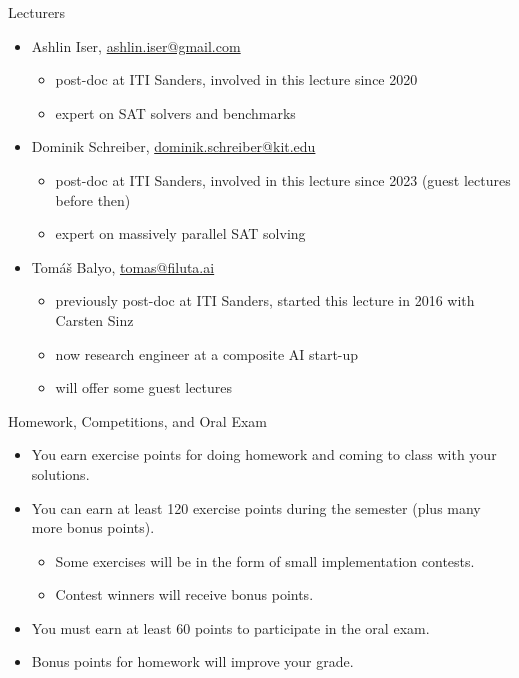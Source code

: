 \documentclass[t]{sdqbeamer}
\begin{document}
\begin{frame}{Lecturers}
\begin{itemize}\setlength{\itemsep}{1em}
	\item Ashlin Iser, \href{mailto:ashlin.iser@gmail.com}{ashlin.iser@gmail.com}
	\begin{itemize}
		\item post-doc at ITI Sanders, involved in this lecture since 2020
		\item expert on SAT solvers and benchmarks
	\end{itemize}
	\item Dominik Schreiber, \href{mailto:dominik.schreiber}{dominik.schreiber@kit.edu}
	\begin{itemize}
		\item post-doc at ITI Sanders, involved in this lecture since 2023 (guest lectures before then)
		\item expert on massively parallel SAT solving
	\end{itemize}
	\item Tom\'a\v{s} Balyo, \href{mailto:tomas@filuta.ai}{tomas@filuta.ai}
	\begin{itemize}
		\item previously post-doc at ITI Sanders, started this lecture in 2016 with Carsten Sinz
		\item now research engineer at a composite AI start-up
		\item will offer some guest lectures 
	\end{itemize}
\end{itemize}
\end{frame}

\begin{frame}{Homework, Competitions, and Oral Exam}
\begin{itemize}\setlength{\itemsep}{1em}
	\item You earn exercise points for doing homework and coming to class with your solutions.
	\item You can earn at least 120 exercise points during the semester (plus many more bonus points).
	\begin{itemize}
		\item Some exercises will be in the form of small implementation contests.
		\item Contest winners will receive bonus points.
	\end{itemize}
	\item You must earn at least 60 points to participate in the oral exam.
	\item Bonus points for homework will improve your grade.
\end{itemize}
\end{frame}
\end{document}
